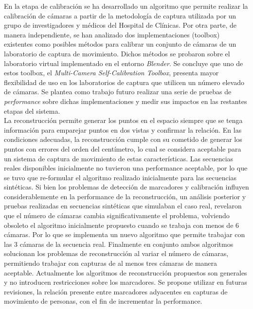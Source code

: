 En la etapa de calibración se ha desarrollado un algoritmo que permite realizar la calibración de cámaras a partir de la metodología de captura utilizada por un grupo de investigadores y médicos del Hospital de Clínicas. Por otra parte, de manera independiente, se han analizado dos implementaciones (toolbox) existentes como posibles métodos para calibrar un conjunto de cámaras de un laboratorio de captura de movimiento. Dichos métodos se probaron sobre el laboratorio virtual implementado en el entorno \emph{Blender}. Se concluye que uno de estos toolbox, el \textit{Multi-Camera Self-Calibration Toolbox}, presenta mayor flexibilidad de uso en los laboratorios de captura que utilicen un número elevado de cámaras. Se plantea como trabajo futuro realizar una serie de pruebas de \textit{performance} sobre dichas implementaciones y medir sus impactos en las restantes etapas del sistema.\\

La reconstrucción permite generar los puntos en el espacio siempre que se tenga información para emparejar puntos en dos vistas y confirmar la relación. En las condiciones adecuadas, la reconstrucción cumple con su cometido de generar los puntos con errores del orden del centímetro, lo cual se considera aceptable para un sistema de captura de movimiento de estas características. 
Las secuencias reales disponibles inicialmente no tuvieron una performance aceptable, por lo que se tuvo que re-formular el algoritmo realizado inicialmente para las secuencias sintéticas. Si bien los problemas de detección de marcadores y calibración influyen considerablemente en la performance de la reconstrucción, un análisis posterior y pruebas realizadas en secuencias sintéticas que simulaban el caso real, revelaron que el número de cámaras cambia significativamente el problema, volviendo obsoleto el algoritmo inicialmente propuesto cuando se trabaja con menos de 6 cámaras. Por lo que se implementa un nuevo algoritmo que permite trabajar con las 3 cámaras de la secuencia real.
Finalmente en conjunto ambos algoritmos solucionan los problemas de reconstrucción al variar el número de cámaras, permitiendo trabajar con capturas de al menos tres cámaras de manera aceptable. 
Actualmente los algoritmos de reconstrucción propuestos son generales y no introducen restricciones sobre los marcadores. Se propone utilizar en futuras revisiones, la relación presente entre marcadores adyacentes en capturas de movimiento de personas, con el fin de incrementar la performance. 
\\ 





